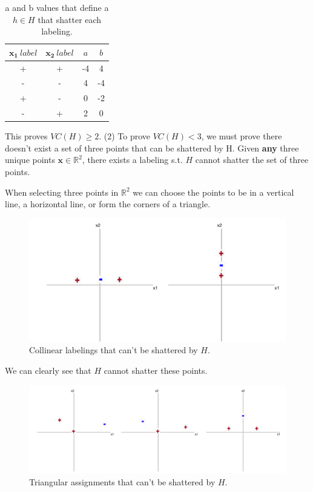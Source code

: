 \documentclass[11pt]{article}
\begin{document}
 \begin{table}[H]
\centering
{\renewcommand{\arraystretch}{1.2}%
\begin{tabular}{| c | c | c | c |}
\hline
$\mathbf{x_1} \ label$& $\mathbf{x_2} \ label$ & $a$ & $b$\\
\hline
+ & + & -4 & 4\\ \hline
- & - & 4 & -4\\ \hline
+ & - & 0& -2 \\ \hline
- & + & 2 & 0\\ \hline
\end{tabular}}
\caption{a and b values that define a $h \in H$ that shatter each labeling.}
\end{table}

This proves $VC(H) \geq 2$. (2) To prove $VC(H) < 3$, we must prove there doesn't exist a set of three points that can be shattered by H. Given \textbf{any} three unique points $\mathbf{x} \in \mathbb{R}^2$, there exists a labeling s.t. $H$ cannot shatter the set of three points.

When selecting three points in $\mathbb{R}^2$ we can choose the points to be in a vertical line, a horizontal line, or form the corners of a triangle.

\begin{figure}[H]
  \centerline{\includegraphics[width=0.5\linewidth]{image_2_4_2.png}}
  \caption{Collinear labelings that can't be shattered by $H$.}
\end{figure}

We can clearly see that $H$ cannot shatter these points.

\begin{figure}[H]
  \centerline{\includegraphics[width=0.8\linewidth]{image_2_4_3.png}}
  \caption{Triangular assignments that can't be shattered by $H$.}
\end{figure}
\end{document}
